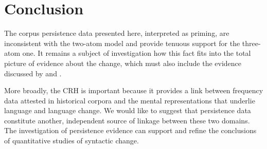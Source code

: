 \documentclass{article}
\begin{document}
\section{Conclusion}
\label{sec:conclusion}

The corpus persistence data presented here, interpreted as priming, are
inconsistent with the two-atom model and provide tenuous support for the
three-atom one.  It remains a subject of investigation how this fact
fits into the total picture of evidence about the change, which must
also include the evidence discussed by \textcite{Frisch1997} and
\textcite{wallage08}.

More broadly, the CRH is important because it provides a link between
frequency data attested in historical corpora and the mental
representations that underlie language and language change.  We would
like to suggest that persistence data constitute another, independent
source of linkage between these two domains.  The investigation of
persistence evidence can support and refine the conclusions of
quantitative studies of syntactic change.

\printbibliography
\end{document}
